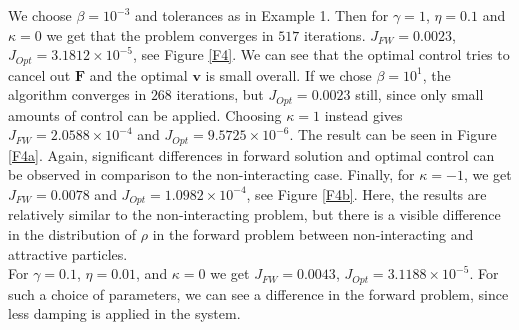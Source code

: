 \documentclass[11pt, a4paper]{article}
\theoremstyle{definition}
\begin{document}
	We choose $ \beta = 10^{-3}$ and tolerances as in Example 1. Then for $\gamma = 1$, $\eta = 0.1$ and $\kappa = 0$ we get that the problem converges in $517$ iterations. $J_{FW} = 0.0023$, $J_{Opt} = 3.1812 \times 10^{-5}$, see Figure \ref{F4}. We can see that the optimal control tries to cancel out $\mathbf F$ and the optimal $\mathbf v$ is small overall. If we chose $\beta = 10^1$, the algorithm converges in $268$ iterations, but $J_{Opt} =0.0023$ still, since only small amounts of control can be applied.
	Choosing $\kappa = 1$ instead gives $J_{FW} = 2.0588 \times 10^{-4}$ and $J_{Opt} = 9.5725 \times 10^{-6}$. The result can be seen in Figure \ref{F4a}. Again, significant differences in forward solution and optimal control can be observed in comparison to the non-interacting case. 
	Finally, for $\kappa = -1$, we get $J_{FW} = 0.0078$ and $J_{Opt} = 1.0982 \times 10^{-4}$, see Figure \ref{F4b}. Here, the results are relatively similar to the non-interacting problem, but there is a visible difference in the distribution of $\rho$ in the forward problem between non-interacting and attractive particles.
	\\
	For $\gamma = 0.1$, $\eta = 0.01$, and $\kappa = 0$ we get $J_{FW} = 0.0043$, $J_{Opt} = 3.1188 \times 10^{-5}$. For such a  choice of parameters, we can see a difference in the forward problem, since less damping is applied in the system.
	
\end{document}
